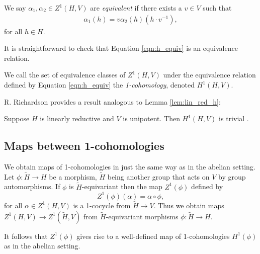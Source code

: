 We say $\alpha_1, \alpha_2 \in Z^1(H, V)$ are \emph{equivalent} if there exists a $v \in V$ such that
\begin{eqnarray}
  \alpha_1(h) = v \alpha_2(h) (h \cdot v^{-1}),
  \label{eqn:h_equiv}
\end{eqnarray}
for all $h \in H$.

It is straightforward to check that Equation \ref{eqn:h_equiv} is an equivalence relation.

We call the set of equivalence classes of $Z^1(H, V)$ under the equivalence relation defined by Equation \ref{eqn:h_equiv} the \emph{1-cohomology}, denoted $H^1(H, V)$.

R. Richardson provides a result analogous to Lemma \ref{lem:lin_red_h}:
\begin{lemma}
  Suppose $H$ is linearly reductive and $V$ is unipotent. Then $H^1(H, V)$ is trivial \cite[Lemma 6.2.6]{richardson1982orbits}.
  \label{lem:nonab_lin_red}
\end{lemma}

\subsection{Maps between 1-cohomologies}

We obtain maps of 1-cohomologies in just the same way as in the abelian setting. Let $\phi: \tilde{H} \rightarrow H$ be a morphism, $\tilde{H}$ being another group that acts on $V$ by group automorphisms. If $\phi$ is $\tilde{H}$-equivariant then the map $Z^1(\phi)$ defined by
\begin{displaymath}
  Z^1(\phi)(\alpha) = \alpha \circ \phi,
\end{displaymath}
for all $\alpha \in Z^1(H, V)$ is a 1-cocycle from $\tilde{H} \rightarrow V$. Thus we obtain maps $Z^1(H, V) \rightarrow Z^1(\tilde{H}, V)$ from $\tilde{H}$-equivariant morphisms $\phi: \tilde{H} \rightarrow H$.

It follows that $Z^1(\phi)$ gives rise to a well-defined map of 1-cohomologies $H^1(\phi)$ as in the abelian setting.

